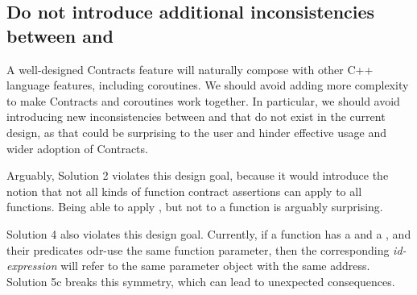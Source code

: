 %


\subsection{Do not introduce additional inconsistencies between  and }

A well-designed Contracts feature will naturally compose with other C++ language features, including coroutines. We should avoid adding more complexity to make Contracts and coroutines work together. In particular, we should avoid introducing new inconsistencies between  and  that do not exist in the current design, as that could be surprising to the user and hinder effective usage and wider adoption of Contracts.

Arguably, Solution 2 violates this design goal, because it would introduce the notion that not all kinds of function contract assertions can apply to all functions. Being able to apply , but not  to a function is arguably surprising.

Solution 4 also violates this design goal. Currently, if a function has a  and a , and their predicates odr-use the same function parameter, then the corresponding \emph{id-expression} will refer to the same parameter object with the same address. Solution 5c breaks this symmetry, which can lead to unexpected consequences.

